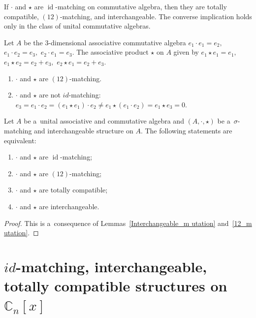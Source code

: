 \documentclass{jonasart}
\DeclareMathOperator{\id}{id}
\begin{document}
	\begin{remark}
		If $\cdot$ and $\star$ are $\id$-matching on commutative algebra, then they are totally compatible, $(12)$-matching, and interchangeable. The converse implication holds only in the class of unital commutative algebras.
	\end{remark}

	\begin{example}
		Let $A$ be the 3-dimensional associative commutative algebra $e_1\cdot e_1 =e_2,$ $ e_1\cdot e_2 =e_3,$ $e_2\cdot e_1 =e_3.$ The associative product $\star$ on $A$ given by $e_1 \star e_1 = e_1,$ $ e_1 \star e_2 = e_2 + e_3, $ $e_2 \star e_1 = e_2 + e_3.$
		\begin{enumerate}
			\item $\cdot$ and $\star$ are $(12)$-matching.
			\item $\cdot$ and $\star$ are not $id$-matching:
			$e_3 = e_1\cdot e_2 =(e_1\star e_1 )\cdot e_2 \neq e_1\star (e_1\cdot e_2 )=e_1\star e_3 =0.$
		\end{enumerate}
	\end{example}

	\begin{corollary}
		Let $A$ be a~unital associative and commutative algebra and $(A, \cdot, \star)$ be a~$\sigma$-matching and interchangeable structure on $A$. The following statements are equivalent:
		\begin{enumerate}
			\item $\cdot$ and $\star$ are $\id$-matching;
			\item $\cdot$ and $\star$ are $(12)$-matching;
			\item $\cdot$ and $\star$ are totally compatible;
			\item $\cdot$ and $\star$ are interchangeable.
		\end{enumerate}
	\end{corollary}

	\begin{proof}
		This is a~consequence of Lemmas~\ref{Interchangeable_m utation} and~\ref{12_m utation}.
	\end{proof}

	\section{\texorpdfstring{\(id\)-matching, interchangeable, totally compatible structures on \(\mathbb{C}_n [x]\)}{id-matching, interchangeable, totally compatible structures on (\_n [x])}}\label{id-inter-total}
\end{document}
